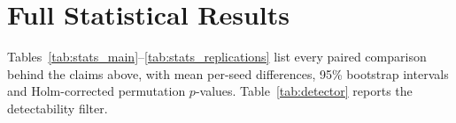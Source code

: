 \section{Full Statistical Results}\label{app:stats}
Tables~\ref{tab:stats_main}--\ref{tab:stats_replications} list every paired comparison behind the claims above, with mean per-seed differences, 95\% bootstrap intervals and Holm-corrected permutation $p$-values. Table~\ref{tab:detector} reports the detectability filter.
